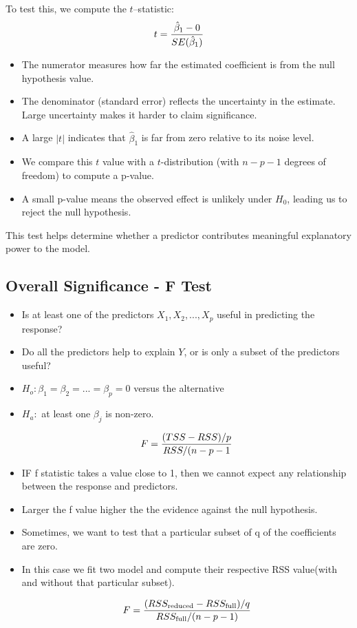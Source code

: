\documentclass[10pt,a4paper]{article}
\begin{document}
	To test this, we compute the $t$–statistic:
	 		\[
		\Large
		t = \frac{\hat{\beta}_1 - 0}{SE(\hat{\beta}_1)}
		\]


	\begin{itemize}
		\item The numerator measures how far the estimated coefficient is from the null hypothesis value.
		\item The denominator (standard error) reflects the uncertainty in the estimate.
		Large uncertainty makes it harder to claim significance.
		\item A large $|t|$ indicates that $\hat{\beta}_1$ is far from zero relative to its noise level.
		\item We compare this $t$ value with a $t$-distribution (with $n - p - 1$ degrees of freedom) to compute a p-value.
		\item A small p-value means the observed effect is unlikely under $H_0$, leading us to reject the null hypothesis.
	\end{itemize}

	This test helps determine whether a predictor contributes meaningful explanatory power to the model.



	\subsection{Overall Significance - F Test}
	\begin{itemize}
		\item Is at least one of the predictors $X_1,X_2,...,X_p$ useful in predicting the response?
		\item Do all the predictors help to explain $Y$, or is only a subset of the predictors useful?

			\item $H_o : \beta_1 = \beta_2 = ... = \beta_p = 0$ versus the alternative
			\item $H_a :$ at least one $\beta_j$ is non-zero.

	\begin{align*}
				\Large F = \frac{(TSS-RSS)/p}{RSS/(n-p-1}
	\end{align*}


		\item IF f statistic takes a value close to 1, then we cannot expect any relationship between the response and predictors.
		\item Larger the f value higher the the evidence against the null hypothesis.

		\item Sometimes, we want to test that a particular subset of q of the coefficients are zero.
		\item In this case we fit two model and compute their respective RSS value(with and without that particular subset).

	\begin{align*}
				\Large F = \frac{ (RSS_{\text{reduced}} - RSS_{\text{full}}) / q }{ RSS_{\text{full}} / (n - p - 1) }
	\end{align*}


	\end{itemize}
\end{document}
